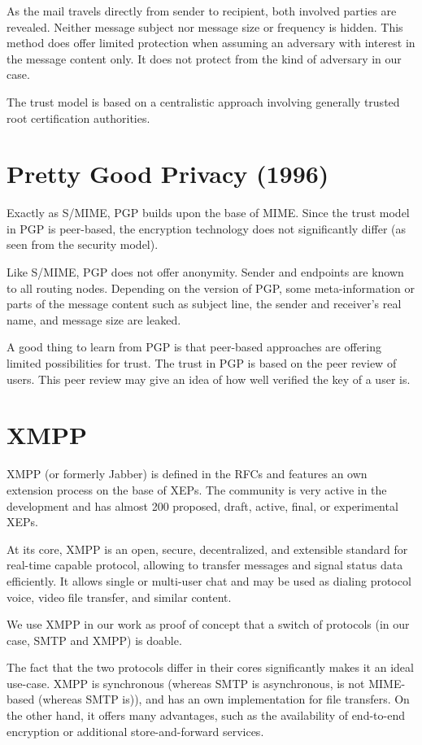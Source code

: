 As the mail travels directly from sender to recipient, both involved parties are revealed. Neither message subject nor message size or frequency is hidden. This method does offer limited protection when assuming an adversary with interest in the message content only. It does not protect from the kind of adversary in our case. 

The trust model is based on a centralistic approach involving generally trusted root certification authorities.

\section*{Pretty Good Privacy (1996)}
Exactly as S/MIME, PGP\cite{rfc4880} builds upon the base of MIME. Since the trust model in PGP is peer-based, the encryption technology does not significantly differ (as seen from the security model).

Like S/MIME, PGP does not offer anonymity. Sender and endpoints are known to all routing nodes. Depending on the version of PGP, some meta-information or parts of the message content such as subject line, the sender and receiver's real name, and message size are leaked.

A good thing to learn from PGP is that peer-based approaches are offering limited possibilities for trust. The trust in PGP is based on the peer review of users. This peer review may give an idea of how well verified the key of a user is.

\section*{XMPP}
XMPP (or formerly Jabber) is defined in the RFCs \cite{rfc6120,rfc6121,rfc3923,rfc3922} and features an own extension process on the base of XEPs. The community is very active in the development and has almost 200 proposed, draft, active, final, or experimental XEPs. 

At its core, XMPP is an open, secure, decentralized, and extensible standard for real-time capable protocol, allowing to transfer messages and signal status data efficiently. It allows single or multi-user chat and may be used as dialing protocol voice, video file transfer, and similar content.

We use XMPP in our work as proof of concept that a switch of protocols (in our case, SMTP and XMPP) is doable.

The fact that the two protocols differ in their cores significantly makes it an ideal use-case. XMPP is synchronous (whereas SMTP is asynchronous, is not MIME-based (whereas SMTP is)), and has an own implementation for file transfers. On the other hand, it offers many advantages, such as the availability of end-to-end encryption or additional store-and-forward services.


